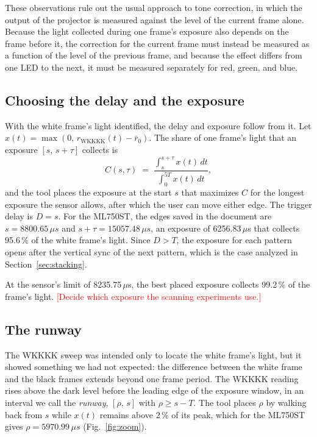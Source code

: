 \documentclass[10pt,journal,compsoc]{IEEEtran}
\newcommand{\SI}[2]{#1\,#2}
\newcommand{\micro}{\ensuremath{\mu}}
\newcommand{\second}{s}\newcommand{\hertz}{Hz}\newcommand{\metre}{m}
\newcommand{\percent}{\%}
\newcommand{\pending}[1]{\textcolor{red}{[#1]}}
\begin{document}
These observations rule out the usual approach to tone correction, in which the output of the
projector is measured against the level of the current frame alone. Because the light collected
during one frame's exposure also depends on the frame before it, the correction for the current
frame must instead be measured as a function of the level of the previous frame, and because the
effect differs from one LED to the next, it must be measured separately for red, green, and blue.

\subsection{Choosing the delay and the exposure}
\label{sec:exposure}
With the white frame's light identified, the delay and exposure follow from it. Let
$x(t)=\max(0,\,r_{\text{WKKKK}}(t)-\bar r_0)$. The share of one frame's light that an exposure
$[s,\,s+\tau]$ collects is
\begin{equation}
C(s,\tau) \;=\; \frac{\int_{s}^{s+\tau} x(t)\,dt}{\int_{0}^{5T} x(t)\,dt},
\label{eq:capture}
\end{equation}
and the tool places the exposure at the start $s$ that maximizes $C$ for the longest exposure the
sensor allows, after which the user can move either edge. The trigger delay is $D=s$. For the
ML750ST, the edges saved in the document are $s=\SI{8800.65}{\micro\second}$ and
$s+\tau=\SI{15057.48}{\micro\second}$, an exposure of \SI{6256.83}{\micro\second} that collects
\SI{95.6}{\percent} of the white frame's light. Since $D>T$, the exposure for each pattern opens
after the vertical sync of the next pattern, which is the case analyzed in
Section~\ref{sec:stacking}.

At the sensor's limit of \SI{8235.75}{\micro\second}, the best placed
exposure collects \SI{99.2}{\percent} of the frame's
light. \pending{Decide which exposure the scanning experiments use.}

\subsection{The runway}
\label{sec:runway}
The WKKKK sweep was intended only to locate the white frame's light, but it showed something we
had not expected: the difference between the white frame and the black frames extends beyond one
frame period. The WKKKK reading rises above the dark level before the leading edge of the
exposure window, in an interval we call the \emph{runway}, $[\rho,\,s]$ with $\rho\ge s-T$. The
tool places $\rho$ by walking back from $s$ while $x(t)$ remains above \SI{2}{\percent} of its
peak, which for the ML750ST gives $\rho=\SI{5970.99}{\micro\second}$
(Fig.~\ref{fig:zoom}).
\end{document}
